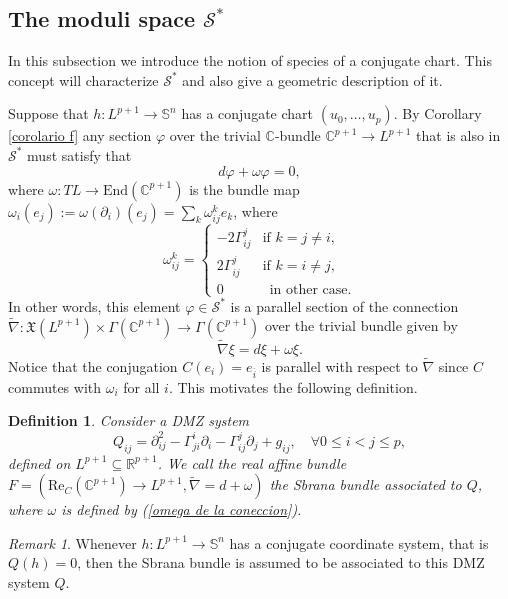 \documentclass{article}
\newtheorem{defn}[thm]{Definition}
\theoremstyle{remark}
\newtheorem{remark}[thm]{Remark}
\begin{document}
\subsection{The moduli space \texorpdfstring{$\mathcal{S}^{*}$}{TEXT}}\label{seccion especie}

In this subsection we introduce the notion of species of a conjugate chart. This concept will characterize $\mathcal{S}^{*}$ and also give a geometric description of it.

\text{ }

Suppose that $h:L^{p+1}\rightarrow\mathbb{S}^n$ has a conjugate chart $(u_0,\ldots,u_p)$. By Corollary \ref{corolario f} any section $\varphi$ over the trivial $\mathbb{C}$-bundle $\mathbb{C}^{p+1}\rightarrow L^{p+1}$ that is also in $\mathcal{S}^{*}$ must satisfy that
\begin{equation*}
    d\varphi+\omega\varphi=0,
\end{equation*}
where $\omega:TL\rightarrow\text{End}(\mathbb{C}^{p+1})$ is the bundle map $\omega_i(e_j):=\omega(\partial_i)(e_j)=\sum_k\omega_{ij}^ke_k$, where
\begin{equation}\label{omega de la coneccion}
    \omega_{ij}^k=\left\{ \begin{array}{lr}
         -2\Gamma_{ij}^j&  \text{if } k=j\neq i,\\
         2\Gamma_{ij}^j&  \text{if } k=i\neq j,\\
         0 &\,\text{ in other case}.
    \end{array}\right.
\end{equation}
In other words, this element $\varphi\in\mathcal{S}^{*}$ is a parallel section of the connection $\tilde{\nabla}:\mathfrak{X}(L^{p+1})\times\Gamma(\mathbb{C}^{p+1})\rightarrow\Gamma(\mathbb{C}^{p+1})$ over the trivial bundle given by
\begin{equation}\label{definicion de la conexion en el trivial}
    \tilde{\nabla}\xi=d\xi+\omega\xi.
\end{equation}
Notice that the conjugation $C(e_i)=e_{\overline{i}}$ is parallel with respect to $\tilde{\nabla}$ since $C$ commutes with $\omega_i$ for all $i$. This motivates the following definition.

\begin{defn}\label{sbrana bundle}
    \normalfont Consider a DMZ system 
    $$Q_{ij}=\partial_{ij}^2-\Gamma_{ji}^i\partial_i-\Gamma_{ij}^j\partial_j+g_{ij},\quad\forall 0\leq i<j\leq p,$$
    defined on $L^{p+1}\subseteq\mathbb{R}^{p+1}$. We call the real affine bundle $F=(\text{Re}_C(\mathbb{C}^{p+1})\rightarrow L^{p+1}, \tilde{\nabla}=d+\omega)$ the {\it Sbrana bundle associated to $Q$}, where $\omega$ is defined by (\ref{omega de la coneccion}).
\end{defn}
\begin{remark}
    Whenever $h:L^{p+1}\rightarrow\mathbb{S}^n$ has a conjugate coordinate system, that is $Q(h)=0$, then the Sbrana bundle is assumed to be associated to this DMZ system $Q$. 
\end{remark}
\end{document}
